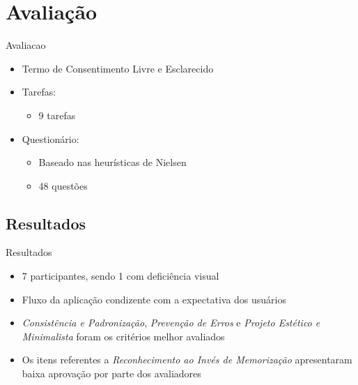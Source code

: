 \section{Avaliação}\label{sec:avaliacao}
\begin{frame}{Avaliacao}
	\begin{itemize}
		\setlength{\itemsep}{1em}
		\item<1-> Termo de Consentimento Livre e Esclarecido
		\item<1-> Tarefas:
		\begin{itemize}
			\setlength{\itemsep}{0.5em}
			\item<1-> 9 tarefas
		\end{itemize}
		\item<1-> Questionário:
		\begin{itemize}
			\setlength{\itemsep}{0.5em}
			\item<1-> Baseado nas heurísticas de Nielsen
			\item<1-> 48 questões
		\end{itemize}
	\end{itemize}	
\end{frame}

\subsection{Resultados}
\begin{frame}{Resultados}
	\begin{itemize}
		\setlength{\itemsep}{1em}
		\item<1-> 7 participantes, sendo 1 com deficiência visual	
		\item<1-> Fluxo da aplicação condizente com a expectativa dos usuários 
		\item<1-> \textit{Consistência e Padronização}, \textit{Prevenção de Erros} e \textit{Projeto Estético e Minimalista} foram os critérios melhor avaliados
		\item<1-> Os itens referentes a \textit{Reconhecimento ao Invés de Memorização} apresentaram baixa aprovação por parte dos avaliadores
	\end{itemize}
\end{frame}

